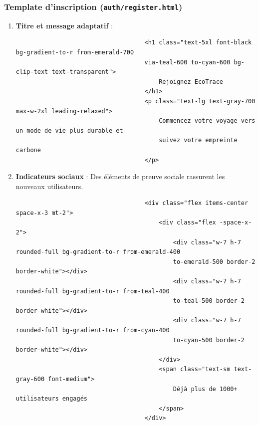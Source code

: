 \documentclass[a4paper,11pt]{article}
\begin{document}
                \subsubsection{Template d'inscription (\texttt{auth/register.html})}
                    \begin{enumerate}
                        \item \textbf{Titre et message adaptatif} :
                            \begin{tcolorbox}[colback=lightgray!6, colframe=black, left=-60mm, right=5mm, top=2mm, bottom=0mm, boxrule=0.1mm]
                                \begin{verbatim}
                                    <h1 class="text-5xl font-black bg-gradient-to-r from-emerald-700 
                                    via-teal-600 to-cyan-600 bg-clip-text text-transparent">
                                        Rejoignez EcoTrace
                                    </h1>
                                    <p class="text-lg text-gray-700 max-w-2xl leading-relaxed">
                                        Commencez votre voyage vers un mode de vie plus durable et 
                                        suivez votre empreinte carbone
                                    </p>
                                \end{verbatim}
                            \end{tcolorbox}

                        \item \textbf{Indicateurs sociaux} : Des éléments de preuve sociale rassurent les nouveaux utilisateurs.
                            \begin{tcolorbox}[colback=lightgray!6, colframe=black, left=-70mm, right=5mm, top=2mm, bottom=0mm, boxrule=0.1mm]
                                \begin{verbatim}
                                    <div class="flex items-center space-x-3 mt-2">
                                        <div class="flex -space-x-2">
                                            <div class="w-7 h-7 rounded-full bg-gradient-to-r from-emerald-400
                                            to-emerald-500 border-2 border-white"></div>
                                            <div class="w-7 h-7 rounded-full bg-gradient-to-r from-teal-400 
                                            to-teal-500 border-2 border-white"></div>
                                            <div class="w-7 h-7 rounded-full bg-gradient-to-r from-cyan-400 
                                            to-cyan-500 border-2 border-white"></div>
                                        </div>
                                        <span class="text-sm text-gray-600 font-medium">
                                            Déjà plus de 1000+ utilisateurs engagés
                                        </span>
                                    </div>
                                \end{verbatim}
                            \end{tcolorbox}


\end{enumerate}
\end{document}
